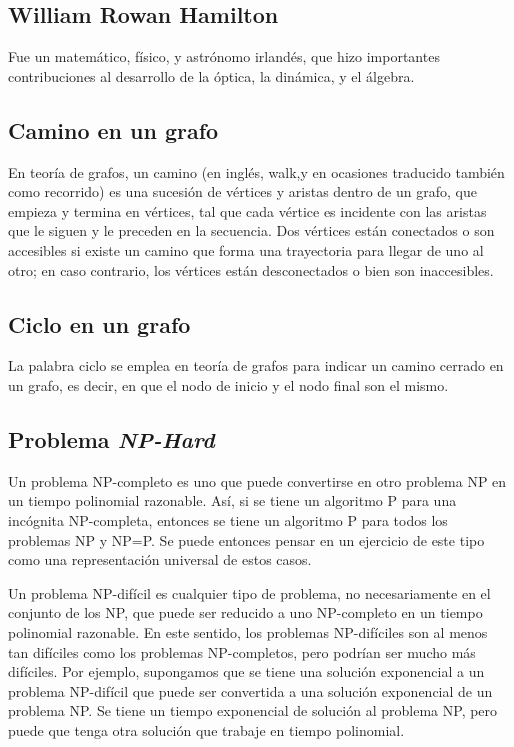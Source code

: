 \subsection{William Rowan Hamilton}
Fue un matemático, físico, y astrónomo irlandés, que hizo importantes contribuciones al desarrollo de la óptica, la dinámica, y el álgebra.

\subsection{Camino en un grafo}
En teoría de grafos, un camino (en inglés, walk,y en ocasiones traducido también como recorrido) es una sucesión de vértices y aristas dentro de un grafo, que empieza y termina en vértices, tal
que cada vértice es incidente con las aristas que le siguen y le preceden en la secuencia. Dos vértices están conectados o son accesibles si existe un camino que forma una trayectoria para llegar de
uno al otro; en caso contrario, los vértices están desconectados o bien son inaccesibles.

\subsection{Ciclo en un grafo}
La palabra ciclo se emplea en teoría de grafos para indicar un camino cerrado en un grafo, es
decir, en que el nodo de inicio y el nodo final son el mismo.

\subsection{Problema \emph{NP-Hard}}
Un problema NP-completo es uno que puede convertirse en otro problema NP en un tiempo polinomial razonable. Así, si se tiene un algoritmo P para una incógnita NP-completa, entonces se tiene un algoritmo P para todos los problemas NP y NP=P. Se puede entonces pensar en un ejercicio de este tipo como una representación universal de estos casos.

Un problema NP-difícil es cualquier tipo de problema, no necesariamente en el conjunto de los NP, que puede ser reducido a uno NP-completo en un tiempo polinomial razonable. En este sentido, los problemas NP-difíciles son al menos tan difíciles como los problemas NP-completos, pero podrían ser mucho más difíciles. Por ejemplo, supongamos que se tiene una solución exponencial a un problema NP-difícil que puede ser convertida a una solución exponencial de un problema NP. Se tiene un tiempo exponencial de solución al problema NP, pero puede que tenga otra solución que trabaje en tiempo polinomial.

